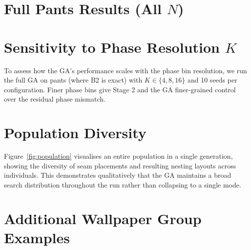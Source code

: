 \documentclass[runningheads]{llncs}
\begin{document}

\section{Full Pants Results (All $N$)}
\label{sup:pants_full}


\section{Sensitivity to Phase Resolution $K$}
\label{sup:k_sensitivity}

To assess how the GA's performance scales with the phase bin
resolution, we run the full GA on pants (where B2 is exact) with
$K \in \{4, 8, 16\}$ and 10 seeds per configuration. Finer phase bins
give Stage 2 and the GA finer-grained control over the residual
phase mismatch.


\section{Population Diversity}
\label{sup:population}

Figure~\ref{fig:population} visualises an entire population in a
single generation, showing the diversity of seam placements and
resulting nesting layouts across individuals. This demonstrates
qualitatively that the GA maintains a broad search distribution
throughout the run rather than collapsing to a single mode.


\section{Additional Wallpaper Group Examples}
\label{sup:wallpaper_examples}
\end{document}

